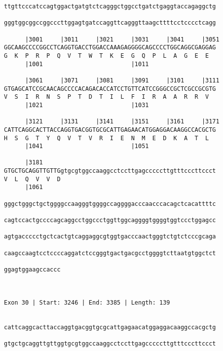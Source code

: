 \documentclass{article}
\begin{document}
\begin{Verbatim}
ttgttcccatccagtggactgatgtctcagggctggcctgatctgaggtaccagaggctg
                                                            
gggtggcggccggcccttggagtgatccaggttcagggttaagcttttcctcccctcagg
                                                            
      |3001     |3011     |3021     |3031     |3041     |3051
GGCAAGCCCCGGCCTCAGGTGACCTGGACCAAAGAGGGGCAGCCCCTGGCAGGCGAGGAG
G  K  P  R  P  Q  V  T  W  T  K  E  G  Q  P  L  A  G  E  E  
      |1001                         |1011                   
  
      |3061     |3071     |3081     |3091     |3101     |3111
GTGAGCATCCGCAACAGCCCCACAGACACCATCCTGTTCATCCGGGCCGCTCGCCGCGTG
V  S  I  R  N  S  P  T  D  T  I  L  F  I  R  A  A  R  R  V  
      |1021                         |1031                   
  
      |3121     |3131     |3141     |3151     |3161     |3171
CATTCAGGCACTTACCAGGTGACGGTGCGCATTGAGAACATGGAGGACAAGGCCACGCTG
H  S  G  T  Y  Q  V  T  V  R  I  E  N  M  E  D  K  A  T  L  
      |1041                         |1051                   
  
      |3181                                                 
GTGCTGCAGGTTGTTGgtgcgtggccaaggcctccttgagcccccttgtttcccttccct
V  L  Q  V  V  D                                            
      |1061                                                 
  
gggctgggctgctggggccaagggtggggccaggggacccaacccacagctcacattttc
                                                            
cagtccactgccccagcaggcctggccctggttggcaggggtggggtggtccctggagcc
                                                            
agtgaccccctgctcactgtcaggaggcgtggtgacccaactgggtctgtctcccgcaga
                                                            
caagccaagtcctccccaggatctccgggtgactgacgcctggggtcttaatgtggctct
                                                            
ggagtggaagccaccc
                
                
 
Exon 30 | Start: 3246 | End: 3385 | Length: 139


cattcaggcacttaccaggtgacggtgcgcattgagaacatggaggacaaggccacgctg
                                                            
gtgctgcaggttgttggtgcgtggccaaggcctccttgagcccccttgtttcccttccct
                                                            

\end{Verbatim}
\end{document}
